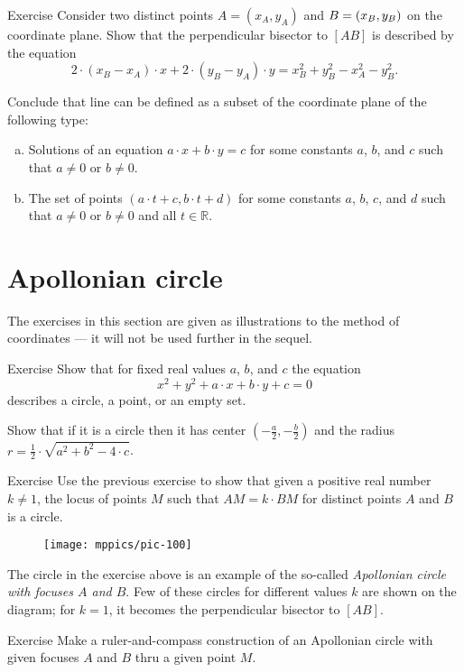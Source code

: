 \begin{thm}{Exercise}\label{ex:line-coord}
Consider two distinct points $A=(x_A,y_A)$ and $B\z=(x_B,y_B)$ on the coordinate plane.
Show that the perpendicular bisector to $[AB]$ is described by the equation
\[2\cdot (x_B-x_A)\cdot x+2\cdot (y_B-y_A)\cdot y=x_B^2+y_B^2-x_A^2-y_B^2.\]

Conclude that line can be defined as a subset of the coordinate plane of the following type:
\begin{enumerate}[(a)]
\item  Solutions of an equation $a\cdot x+b\cdot y=c$
for some constants $a$, $b$, and $c$ such that $a\ne 0$ or $b\ne0$.
\item\label{ex:line-coord:parameter} The set of points $(a\cdot t+c,b\cdot t+d)$ for some constants $a$, $b$, $c$, and $d$ such that $a\ne 0$ or $b\ne0$ and all $t\in \mathbb{R}$.
\end{enumerate}

\end{thm}

\section*{Apollonian circle}

The exercises in this section are given as illustrations to the method of coordinates --- it will not be used further in the sequel.

\begin{thm}{Exercise}\label{ex:circle-coord}
Show that for fixed real values $a$, $b$, and $c$ the equation 
\[x^2+y^2+a\cdot x+b\cdot y+c=0\]
describes a circle, a point, or an empty set.

Show that if it is a circle then it has center $(-\tfrac a2,-\tfrac b2)$ and the radius $r=\tfrac12\cdot \sqrt{a^2+b^2-4\cdot c}$.
\end{thm}

\begin{thm}{Exercise}\label{ex:apolonnius}
Use the previous exercise to show that given a positive real number $k\ne1$,
the locus of points $M$ such that $AM=k\cdot BM$ 
for distinct points $A$ and $B$
is a circle. 
\end{thm}

\begin{figure}[!ht]
\centering
\texttt{[image: mppics/pic-100]}
\end{figure}

The circle in the exercise above is an example of the so-called \emph{Apollonian circle with focuses $A$ and $B$}.
Few of these circles for different values $k$ are shown on the diagram; for $k=1$, it becomes the perpendicular bisector to $[AB]$.


\begin{thm}{Exercise}\label{ex:apolonnius-construction}
Make a ruler-and-compass construction of an Apollonian circle with given focuses $A$ and $B$ thru a given point $M$.
\end{thm}








